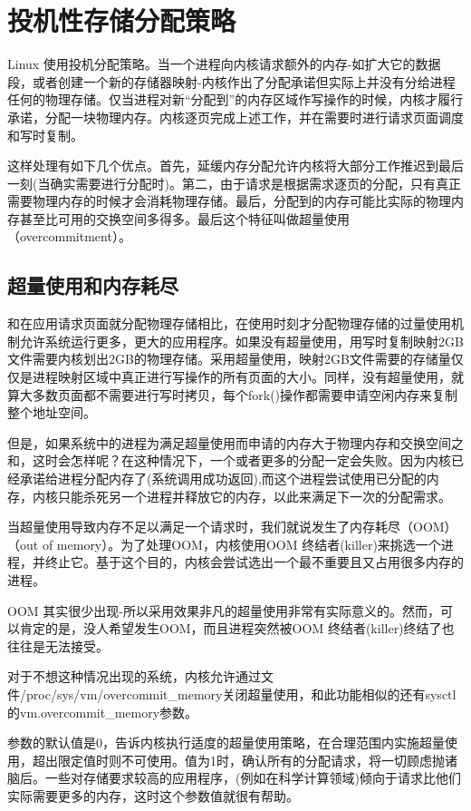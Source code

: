 \section{投机性存储分配策略}

Linux 使用投机分配策略。当一个进程向内核请求额外的内存-如扩大它的数据段，或者创建一个新的存储器映射-内核作出了分配承诺但实际上并没有分给进程任何的物理存储。仅当进程对新“分配到”的内存区域作写操作的时候，内核才履行承诺，分配一块物理内存。内核逐页完成上述工作，并在需要时进行请求页面调度和写时复制。

这样处理有如下几个优点。首先，延缓内存分配允许内核将大部分工作推迟到最后一刻(当确实需要进行分配时)。第二，由于请求是根据需求逐页的分配，只有真正需要物理内存的时候才会消耗物理存储。最后，分配到的内存可能比实际的物理内存甚至比可用的交换空间多得多。最后这个特征叫做超量使用（overcommitment）。 

\subsection{超量使用和内存耗尽}

和在应用请求页面就分配物理存储相比，在使用时刻才分配物理存储的过量使用机制允许系统运行更多，更大的应用程序。如果没有超量使用，用写时复制映射2GB文件需要内核划出2GB的物理存储。采用超量使用，映射2GB文件需要的存储量仅仅是进程映射区域中真正进行写操作的所有页面的大小。同样，没有超量使用，就算大多数页面都不需要进行写时拷贝，每个fork()操作都需要申请空闲内存来复制整个地址空间。

但是，如果系统中的进程为满足超量使用而申请的内存大于物理内存和交换空间之和，这时会怎样呢？在这种情况下，一个或者更多的分配一定会失败。因为内核已经承诺给进程分配内存了(系统调用成功返回),而这个进程尝试使用已分配的内存，内核只能杀死另一个进程并释放它的内存，以此来满足下一次的分配需求。

当超量使用导致内存不足以满足一个请求时，我们就说发生了内存耗尽（OOM）（out of memory）。为了处理OOM，内核使用OOM 终结者(killer)来挑选一个进程，并终止它。基于这个目的，内核会尝试选出一个最不重要且又占用很多内存的进程。

OOM 其实很少出现-所以采用效果非凡的超量使用非常有实际意义的。然而，可以肯定的是，没人希望发生OOM，而且进程突然被OOM 终结者(killer)终结了也往往是无法接受。

对于不想这种情况出现的系统，内核允许通过文件/proc/sys/vm/overcommit\_memory关闭超量使用，和此功能相似的还有sysctl的vm.overcommit\_memory参数。

参数的默认值是0，告诉内核执行适度的超量使用策略，在合理范围内实施超量使用，超出限定值时则不可使用。值为1时，确认所有的分配请求，将一切顾虑抛诸脑后。一些对存储要求较高的应用程序，(例如在科学计算领域)倾向于请求比他们实际需要更多的内存，这时这个参数值就很有帮助。


